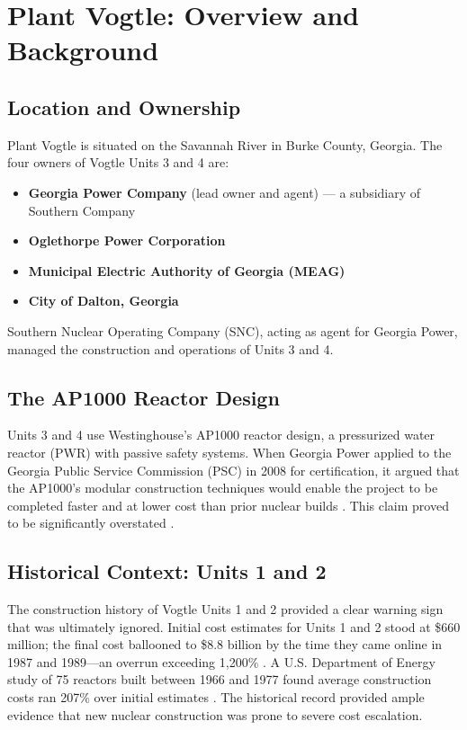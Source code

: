 \documentclass[12pt,a4paper]{article}
\begin{document}
\section{Plant Vogtle: Overview and Background}

\subsection{Location and Ownership}

Plant Vogtle is situated on the Savannah River in Burke County, Georgia. The four
owners of Vogtle Units 3 and 4 are:

\begin{itemize}
    \item \textbf{Georgia Power Company} (lead owner and agent) --- a subsidiary of Southern Company
    \item \textbf{Oglethorpe Power Corporation}
    \item \textbf{Municipal Electric Authority of Georgia (MEAG)}
    \item \textbf{City of Dalton, Georgia}
\end{itemize}

Southern Nuclear Operating Company (SNC), acting as agent for Georgia Power,
managed the construction and operations of Units 3 and 4.

\subsection{The AP1000 Reactor Design}

Units 3 and 4 use Westinghouse's AP1000 reactor design, a pressurized water reactor
(PWR) with passive safety systems. When Georgia Power applied to the Georgia Public
Service Commission (PSC) in 2008 for certification, it argued that the AP1000's modular
construction techniques would enable the project to be completed faster and at lower
cost than prior nuclear builds \cite{schlissel_ieefa,gpsc_2008}. This claim proved to be significantly overstated \cite{schlissel_ieefa}.

\subsection{Historical Context: Units 1 and 2}

The construction history of Vogtle Units 1 and 2 provided a clear warning sign
that was ultimately ignored. Initial cost estimates for Units 1 and 2 stood at
\$660 million; the final cost ballooned to \$8.8 billion by the time they came online
in 1987 and 1989---an overrun exceeding 1,200\% \cite{schlissel_ieefa}. A U.S. Department of Energy
study of 75 reactors built between 1966 and 1977 found average construction costs
ran 207\% over initial estimates \cite{doe_eia0485,schlissel_ieefa}. The historical record provided ample evidence that
new nuclear construction was prone to severe cost escalation.
\end{document}
